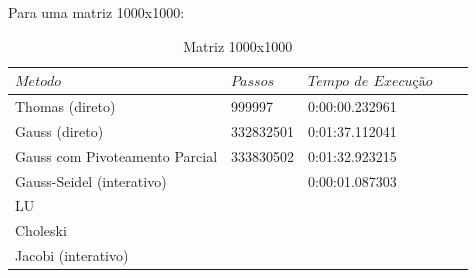 \documentclass{article}
\begin{document}
\begin{itemize}
\newpage

\text Para uma matriz 1000x1000:

\begin{table}[h]
\centering
  \begin{tabular}{l||l|lll}
    $Metodo$ & $Passos$ & $Tempo$ $de$ $Execução$ \\
    \hline
    Thomas (direto) & 999997  & 0:00:00.232961 \\
    
    Gauss (direto) & 332832501 & 0:01:37.112041 \\
    
    Gauss com Pivoteamento Parcial & 333830502 & 0:01:32.923215 \\
    
    Gauss-Seidel (interativo) &  &  0:00:01.087303 \\
    
    LU &  \\
    
    Choleski & \\
    
    Jacobi (interativo) & &  \\
    \hline
  \end{tabular}
  \caption{Matriz 1000x1000}
\end{table}


\end{itemize}
\end{document}
